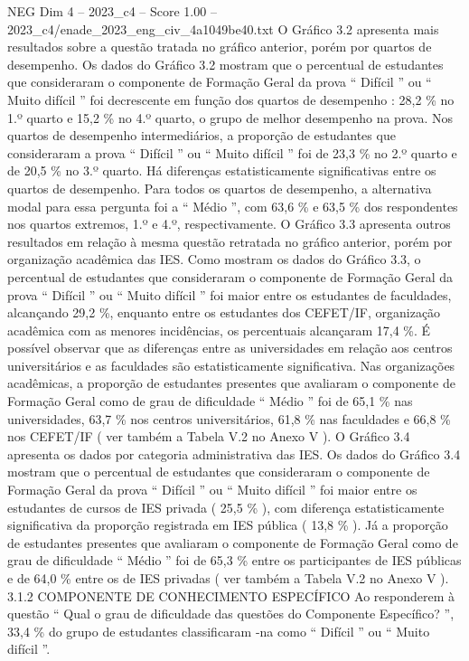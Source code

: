 \begin{textsample}{NEG Dim 4 – 2023\_c4 – Score 1.00 – 2023\_c4/enade\_2023\_eng\_civ\_4a1049be40.txt}
O Gráfico 3.2 apresenta mais resultados sobre a questão tratada no gráfico anterior, porém por quartos de desempenho.
Os dados do Gráfico 3.2 mostram que o percentual de estudantes que consideraram o componente de Formação Geral da prova “ Difícil ” ou “ Muito difícil ” foi decrescente em função dos quartos de desempenho : 28,2 \% no 1.º quarto e 15,2 \% no 4.º quarto, o grupo de melhor desempenho na prova.
Nos quartos de desempenho intermediários, a proporção de estudantes que consideraram a prova “ Difícil ” ou “ Muito difícil ” foi de 23,3 \% no 2.º quarto e de 20,5 \% no 3.º quarto.
Há diferenças estatisticamente significativas entre os quartos de desempenho.
Para todos os quartos de desempenho, a alternativa modal para essa pergunta foi a “ Médio ”, com 63,6 \% e 63,5 \% dos respondentes nos quartos extremos, 1.º e 4.º, respectivamente.
O Gráfico 3.3 apresenta outros resultados em relação à mesma questão retratada no gráfico anterior, porém por organização acadêmica das IES.
Como mostram os dados do Gráfico 3.3, o percentual de estudantes que consideraram o componente de Formação Geral da prova “ Difícil ” ou “ Muito difícil ” foi maior entre os estudantes de faculdades, alcançando 29,2 \%, enquanto entre os estudantes dos CEFET/IF, organização acadêmica com as menores incidências, os percentuais alcançaram 17,4 \%.
É possível observar que as diferenças entre as universidades em relação aos centros universitários e as faculdades são estatisticamente significativa.
Nas organizações acadêmicas, a proporção de estudantes presentes que avaliaram o componente de Formação Geral como de grau de dificuldade “ Médio ” foi de 65,1 \% nas universidades, 63,7 \% nos centros universitários, 61,8 \% nas faculdades e 66,8 \% nos CEFET/IF ( ver também a Tabela V.2 no Anexo V ).
O Gráfico 3.4 apresenta os dados por categoria administrativa das IES.
Os dados do Gráfico 3.4 mostram que o percentual de estudantes que consideraram o componente de Formação Geral da prova “ Difícil ” ou “ Muito difícil ” foi maior entre os estudantes de cursos de IES privada ( 25,5 \% ), com diferença estatisticamente significativa da proporção registrada em IES pública ( 13,8 \% ).
Já a proporção de estudantes presentes que avaliaram o componente de Formação Geral como de grau de dificuldade “ Médio ” foi de 65,3 \% entre os participantes de IES públicas e de 64,0 \% entre os de IES privadas ( ver também a Tabela V.2 no Anexo V ). 3.1.2 COMPONENTE DE CONHECIMENTO ESPECÍFICO Ao responderem à questão “ Qual o grau de dificuldade das questões do Componente Específico? ”, 33,4 \% do grupo de estudantes classificaram -na como “ Difícil ” ou “ Muito difícil ”.

\end{textsample}
